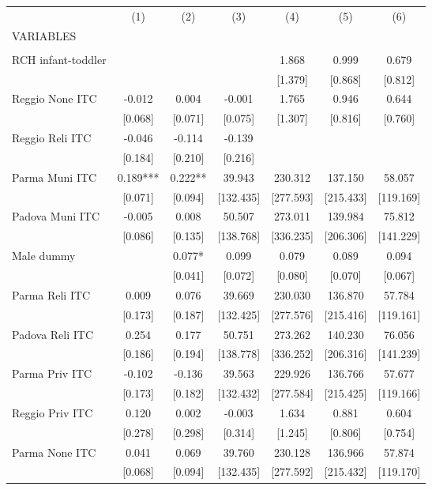 \begin{tabular}{lcccccc} \hline
 & (1) & (2) & (3) & (4) & (5) & (6) \\
VARIABLES &  &  &  &  &  &  \\ \hline
 &  &  &  &  &  &  \\
RCH infant-toddler &  &  &  & 1.868 & 0.999 & 0.679 \\
 &  &  &  & [1.379] & [0.868] & [0.812] \\
Reggio None ITC & -0.012 & 0.004 & -0.001 & 1.765 & 0.946 & 0.644 \\
 & [0.068] & [0.071] & [0.075] & [1.307] & [0.816] & [0.760] \\
Reggio Reli ITC & -0.046 & -0.114 & -0.139 &  &  &  \\
 & [0.184] & [0.210] & [0.216] &  &  &  \\
Parma Muni ITC & 0.189*** & 0.222** & 39.943 & 230.312 & 137.150 & 58.057 \\
 & [0.071] & [0.094] & [132.435] & [277.593] & [215.433] & [119.169] \\
Padova Muni ITC & -0.005 & 0.008 & 50.507 & 273.011 & 139.984 & 75.812 \\
 & [0.086] & [0.135] & [138.768] & [336.235] & [206.306] & [141.229] \\
Male dummy &  & 0.077* & 0.099 & 0.079 & 0.089 & 0.094 \\
 &  & [0.041] & [0.072] & [0.080] & [0.070] & [0.067] \\
Parma Reli ITC & 0.009 & 0.076 & 39.669 & 230.030 & 136.870 & 57.784 \\
 & [0.173] & [0.187] & [132.425] & [277.576] & [215.416] & [119.161] \\
Padova Reli ITC & 0.254 & 0.177 & 50.751 & 273.262 & 140.230 & 76.056 \\
 & [0.186] & [0.194] & [138.778] & [336.252] & [206.316] & [141.239] \\
Parma Priv ITC & -0.102 & -0.136 & 39.563 & 229.926 & 136.766 & 57.677 \\
 & [0.173] & [0.182] & [132.432] & [277.584] & [215.425] & [119.166] \\
Reggio Priv ITC & 0.120 & 0.002 & -0.003 & 1.634 & 0.881 & 0.604 \\
 & [0.278] & [0.298] & [0.314] & [1.245] & [0.806] & [0.754] \\
Parma None ITC & 0.041 & 0.069 & 39.760 & 230.128 & 136.966 & 57.874 \\
 & [0.068] & [0.094] & [132.435] & [277.592] & [215.432] & [119.170] \\

\end{tabular}
